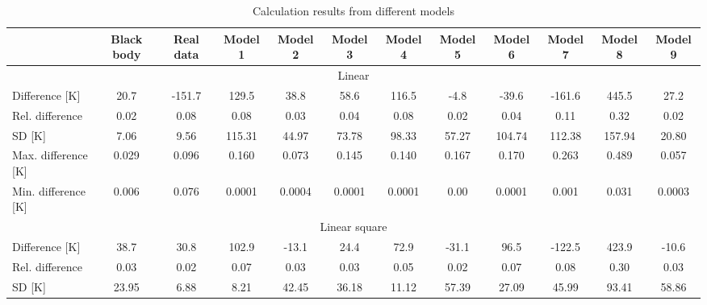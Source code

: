 {\linespread{1}
\begin{table}
    \centering
    \caption{Calculation results from different models}
    \label{tab: statistic_results}
    \begin{tabular}{lccccccccccc}
        \hline
        & \multicolumn{1}{c}{Black body} & \multicolumn{1}{c}{Real data} & Model 1 & Model 2 & Model 3 & Model 4 & Model 5 & Model 6 & Model 7 & Model 8 & Model 9 \\ \hline
        \multicolumn{12}{c}{Linear}                                                                                                                                                         \\ \hline
        Difference {[}K{]}      & 20.7                           & -151.7                        & 129.5   & 38.8    & 58.6    & 116.5   & -4.8    & -39.6   & -161.6  & 445.5   & 27.2     \\
        Rel. difference         & 0.02                           & 0.08                          & 0.08    & 0.03    & 0.04    & 0.08    & 0.02    & 0.04    & 0.11    & 0.32    & 0.02     \\
        SD {[}K{]}              & 7.06                           & 9.56                          & 115.31  & 44.97   & 73.78   & 98.33   & 57.27   & 104.74  & 112.38  & 157.94  & 20.80    \\
        Max. difference {[}K{]} & 0.029                          & 0.096                         & 0.160   & 0.073   & 0.145   & 0.140   & 0.167   & 0.170   & 0.263   & 0.489   & 0.057    \\
        Min. difference {[}K{]} & 0.006                          & 0.076                         & 0.0001  & 0.0004  & 0.0001  & 0.0001  & 0.00    & 0.0001  & 0.001   & 0.031   & 0.0003   \\ \hline
        \multicolumn{12}{c}{Linear square}                                                                                                                                                   \\ \hline
        Difference {[}K{]}      & 38.7                           & 30.8                          & 102.9   & -13.1   & 24.4    & 72.9    & -31.1   & 96.5    & -122.5  & 423.9   & -10.6   \\
        Rel. difference         & 0.03                           & 0.02                          & 0.07    & 0.03    & 0.03    & 0.05    & 0.02    & 0.07    & 0.08    & 0.30    & 0.03    \\
        SD {[}K{]}              & 23.95                          & 6.88                          & 8.21    & 42.45   & 36.18   & 11.12   & 57.39   & 27.09   & 45.99   & 93.41   & 58.86   \\

\end{tabular}
\end{table}}
